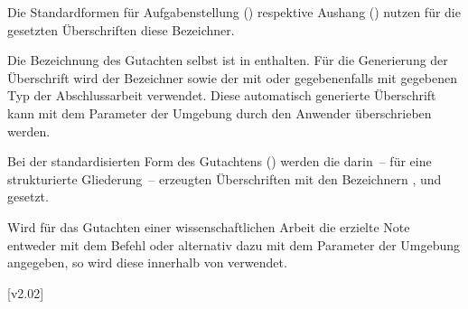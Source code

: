 \begin{DeclareEntity}{}
\begin{Declaration}
\begin{Declaration}
Die Standardformen für Aufgabenstellung () respektive Aushang 
() nutzen für die gesetzten Überschriften diese Bezeichner.
\TermTable
\end{Declaration}
\end{Declaration}

\begin{Declaration}
  {}
\begin{Declaration}
  {}
\printdeclarationlist

Die Bezeichnung des Gutachten selbst ist in  enthalten. 
Für die Generierung der Überschrift wird der Bezeichner  
sowie der mit  oder gegebenenfalls mit  gegebenen 
Typ der Abschlussarbeit verwendet. Diese automatisch generierte Überschrift 
kann mit dem Parameter  der Umgebung 
 durch den Anwender überschrieben werden.
\TermTable
\end{Declaration}
\end{Declaration}

\begin{Declaration}
  {}
\begin{Declaration}
  {}
\printdeclarationlist

Bei der standardisierten Form des Gutachtens () werden 
die darin~-- für eine strukturierte Gliederung~-- erzeugten Überschriften mit 
den Bezeichnern ,  und  
gesetzt.
\TermTable
\end{Declaration}
\end{Declaration}

\begin{Declaration}
  {}
\printdeclarationlist

Wird für das Gutachten einer wissenschaftlichen Arbeit die erzielte Note 
entweder mit dem Befehl  oder alternativ dazu 
mit dem Parameter  der Umgebung 
 angegeben, so wird diese innerhalb von 
 verwendet.
\TermTable[.8\textwidth]
\end{Declaration}

\begin{Declaration}
  {}
\begin{Declaration}
  {}
  [v2.02]
\printdeclarationlist


\end{Declaration}
\end{Declaration}
\end{DeclareEntity}
